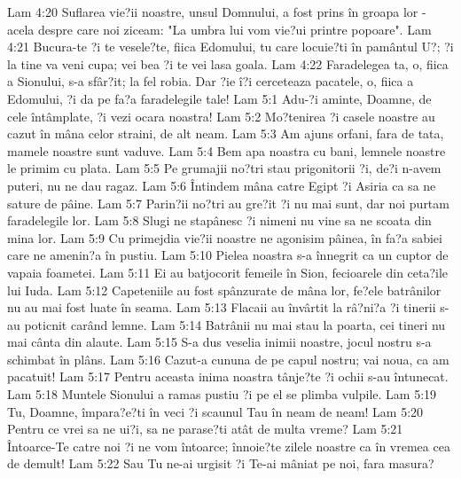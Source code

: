 Lam 4:20  Suflarea vie?ii noastre, unsul Domnului, a fost prins în groapa lor - acela despre care noi ziceam: "La umbra lui vom vie?ui printre popoare".
Lam 4:21  Bucura-te ?i te vesele?te, fiica Edomului, tu care locuie?ti în pamântul U?; ?i la tine va veni cupa; vei bea ?i te vei lasa goala.
Lam 4:22  Faradelegea ta, o, fiica a Sionului, s-a sfâr?it; la fel robia. Dar ?ie î?i cerceteaza pacatele, o, fiica a Edomului, ?i da pe fa?a faradelegile tale!
Lam 5:1  Adu-?i aminte, Doamne, de cele întâmplate, ?i vezi ocara noastra!
Lam 5:2  Mo?tenirea ?i casele noastre au cazut în mâna celor straini, de alt neam.
Lam 5:3  Am ajuns orfani, fara de tata, mamele noastre sunt vaduve.
Lam 5:4  Bem apa noastra cu bani, lemnele noastre le primim cu plata.
Lam 5:5  Pe grumajii no?tri stau prigonitorii ?i, de?i n-avem puteri, nu ne dau ragaz.
Lam 5:6  Întindem mâna catre Egipt ?i Asiria ca sa ne sature de pâine.
Lam 5:7  Parin?ii no?tri au gre?it ?i nu mai sunt, dar noi purtam faradelegile lor.
Lam 5:8  Slugi ne stapânesc ?i nimeni nu vine sa ne scoata din mina lor.
Lam 5:9  Cu primejdia vie?ii noastre ne agonisim pâinea, în fa?a sabiei care ne amenin?a în pustiu.
Lam 5:10  Pielea noastra s-a înnegrit ca un cuptor de vapaia foametei.
Lam 5:11  Ei au batjocorit femeile în Sion, fecioarele din ceta?ile lui Iuda.
Lam 5:12  Capeteniile au fost spânzurate de mâna lor, fe?ele batrânilor nu au mai fost luate în seama.
Lam 5:13  Flacaii au învârtit la râ?ni?a ?i tinerii s-au poticnit carând lemne.
Lam 5:14  Batrânii nu mai stau la poarta, cei tineri nu mai cânta din alaute.
Lam 5:15  S-a dus veselia inimii noastre, jocul nostru s-a schimbat în plâns.
Lam 5:16  Cazut-a cununa de pe capul nostru; vai noua, ca am pacatuit!
Lam 5:17  Pentru aceasta inima noastra tânje?te ?i ochii s-au întunecat.
Lam 5:18  Muntele Sionului a ramas pustiu ?i pe el se plimba vulpile.
Lam 5:19  Tu, Doamne, împara?e?ti în veci ?i scaunul Tau în neam de neam!
Lam 5:20  Pentru ce vrei sa ne ui?i, sa ne parase?ti atât de multa vreme?
Lam 5:21  Întoarce-Te catre noi ?i ne vom întoarce; înnoie?te zilele noastre ca în vremea cea de demult!
Lam 5:22  Sau Tu ne-ai urgisit ?i Te-ai mâniat pe noi, fara masura?


